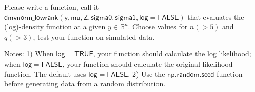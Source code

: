 \documentclass[twoside, letter]{article}
\begin{document}
Please write a function, call it 
$\mathsf{dmvnorm\_lowrank(y, mu, Z, sigma0, sigma1, log = FALSE)}$
that evaluates the (log)-density function at a given $y \in \mathbb{R}^n$.
Choose values for $n (> 5)$ and $q (> 3)$, test your function on simulated data.

Notes: 
1) When $\mathsf{log = TRUE}$, your function should calculate the log likelihood; when 
$\mathsf{log = FALSE}$, your function should calculate the original likelihood function. 
The default uses $\mathsf{log = FALSE}$. 
2) Use the $\mathsf{np.random.seed}$ function before generating data from a random distribution.




 
\end{document}
